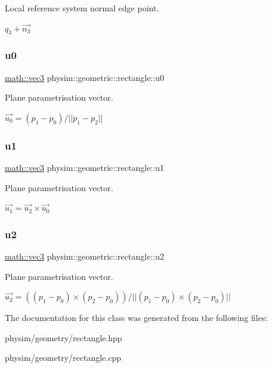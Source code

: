 Local reference system normal edge point. 

$q_3 + \vec{n_3}$ \mbox{\label{classphysim_1_1geometric_1_1rectangle_a09333b95cf8b78186b465a59771f4037}} 
\subsubsection{\texorpdfstring{u0}{u0}}
{\footnotesize\ttfamily \hyperlink{structphysim_1_1math_1_1vec3}{math\+::vec3} physim\+::geometric\+::rectangle\+::u0\hspace{0.3cm}{\ttfamily [private]}}



Plane parametrisation vector. 

$ \vec{u_0} = (p_1 - p_0)/||p_1 - p_2|| $ \mbox{\label{classphysim_1_1geometric_1_1rectangle_a0570b2c50e93ca033123eaaa00a0e068}} 
\subsubsection{\texorpdfstring{u1}{u1}}
{\footnotesize\ttfamily \hyperlink{structphysim_1_1math_1_1vec3}{math\+::vec3} physim\+::geometric\+::rectangle\+::u1\hspace{0.3cm}{\ttfamily [private]}}



Plane parametrisation vector. 

$ \vec{u_1} = \vec{u_2} \times \vec{u_0} $ \mbox{\label{classphysim_1_1geometric_1_1rectangle_a237f0ac5cb92cd71726c5902fb802dc4}} 
\subsubsection{\texorpdfstring{u2}{u2}}
{\footnotesize\ttfamily \hyperlink{structphysim_1_1math_1_1vec3}{math\+::vec3} physim\+::geometric\+::rectangle\+::u2\hspace{0.3cm}{\ttfamily [private]}}



Plane parametrisation vector. 

$ \vec{u_2} = ( (p_1-p_0)\times(p_2-p_0) )/ || (p_1-p_0)\times(p_2-p_0) || $ 

The documentation for this class was generated from the following files\+:\begin{DoxyCompactItemize}
\item 
physim/geometry/rectangle.\+hpp\item 
physim/geometry/rectangle.\+cpp\end{DoxyCompactItemize}
